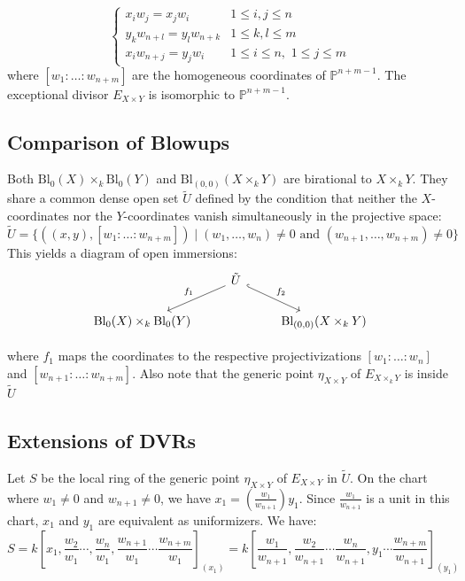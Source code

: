 $$\begin{cases} 
x_i w_j = x_j w_i & 1 \le i, j \le n \\
y_k w_{n+l} = y_l w_{n+k} & 1 \le k, l \le m \\
x_i w_{n+j} = y_j w_i & 1 \le i \le n, \,\, 1 \le j \le m 
\end{cases}$$
where $[w_1 : \dots : w_{n+m}]$ are the homogeneous coordinates of $\mathbb{P}^{n+m-1}$. The exceptional divisor $E_{X \times Y}$ is isomorphic to $\mathbb{P}^{n+m-1}$.

\subsection*{Comparison of Blowups}

Both $\text{Bl}_0(X) \times_k \text{Bl}_0(Y)$ and $\text{Bl}_{(0,0)}(X \times_k Y)$ are birational to $X \times_k Y$. 
They share a common dense open set $\tilde{U}$ defined by the condition that neither the $X$-coordinates nor the $Y$-coordinates vanish simultaneously in the projective space:
$$\tilde{U} = \{ ((x,y), [w_1: \dots : w_{n+m}]) \mid (w_1, \dots, w_n) \neq 0 \text{ and } (w_{n+1}, \dots, w_{n+m}) \neq 0 \}$$This yields a diagram of open immersions:
$$ 
   \begin{tikzcd}
        & \tilde{U} \arrow[dl, "f_1"'] \arrow[dr, "f_2", hook] & \\
        \text{Bl}_0(X) \times_k \text{Bl}_0(Y) & & \text{Bl}_{(0,0)}(X \times_k Y)
    \end{tikzcd}
$$
    
    where $f_1$ maps the coordinates to the respective projectivizations $[w_1: \dots : w_n]$ and $[w_{n+1}: \dots : w_{n+m}]$.
    Also note that the generic point $\eta_{X \times Y}$  of $E_{X \times_k Y}$ is inside $\tilde{U}$

\subsection*{Extensions of DVRs}
Let $S$ be the local ring of the generic point $\eta_{X\times Y}$ of $E_{X \times Y}$ in $\tilde{U}$. 
On the chart where $w_1 \neq 0$ and $w_{n+1} \neq 0$, we have 
$x_1 = (\frac{w_1}{w_{n+1}}) y_1$. 
Since $\frac{w_1}{w_{n+1}}$ is a unit in this chart, $x_1$ and $y_1$ are equivalent as uniformizers.
We have:
$$
S=k\left[x_1, \frac{w_2}{w_1} \cdots, \frac{w_n}{w_1}, \frac{w_{n+1}}{w_1} \cdots \frac{w_{n+m}}{w_1}\right]_{(x_1)} = 
k\left[\frac{w_1}{w_{n+1}}, \frac{w_2}{w_{n+1}} \cdots \frac{w_n}{w_{n+1}}, y_1 \cdots \frac{w_{n+m}}{w_{n+1}}\right]_{(y_1)}
$$

